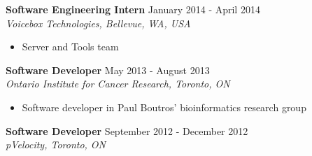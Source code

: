 \documentclass[10pt]{res} %
\begin{document}
\begin{resume}
\textbf{Software Engineering Intern} \hfill January 2014 - April 2014 \\[2pt]
{\sl Voicebox Technologies, Bellevue, WA, USA} 
\begin{itemize}  %
    \item Server and Tools team
\end{itemize}

\textbf{Software Developer} \hfill May 2013 - August 2013 \\[2pt]
{\sl Ontario Institute for Cancer Research, Toronto, ON} 
\begin{itemize}  %
    \item Software developer in Paul Boutros' bioinformatics research group
\end{itemize}

\textbf{Software Developer} \hfill September 2012 - December 2012 \\[2pt]
{\sl pVelocity, Toronto, ON} 





\end{resume}
\end{document}
